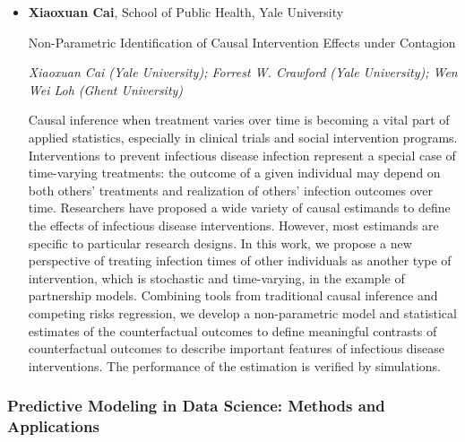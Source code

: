 \begin{itemize}
\item \textbf{Xiaoxuan Cai}, School of Public Health, Yale University

Non-Parametric Identification of Causal Intervention Effects under Contagion

\emph{\footnotesize Xiaoxuan Cai (Yale University); Forrest W. Crawford (Yale University); Wen Wei Loh (Ghent University)}

Causal inference when treatment varies over time is becoming a vital part of applied statistics, especially in clinical trials and social intervention programs. Interventions to prevent infectious disease infection represent a special case of time-varying treatments: the outcome of a given individual may depend on both others’ treatments and realization of others’ infection outcomes over time. Researchers have proposed a wide variety of causal estimands to define the effects of infectious disease interventions. However, most estimands are specific to particular research designs. In this work, we propose a new perspective of treating infection times of other individuals as another type of intervention, which is stochastic and time-varying, in the example of partnership models. Combining tools from traditional causal inference and competing risks regression, we develop a non-parametric model and statistical estimates of the counterfactual outcomes to define meaningful contrasts of counterfactual outcomes to describe important features of infectious disease interventions. The performance of the estimation is verified by simulations.

\end{itemize}

\subsubsection*{Predictive Modeling in Data Science: Methods and Applications}

